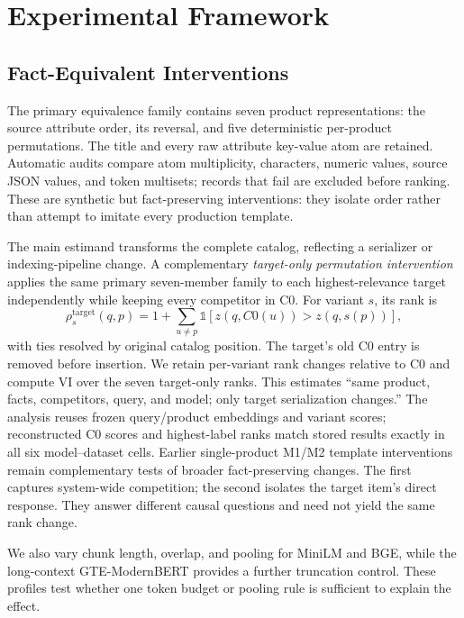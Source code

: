 \section{Experimental Framework}

\subsection{Fact-Equivalent Interventions}

The primary equivalence family contains seven product representations: the source attribute order, its reversal, and five deterministic per-product permutations. The title and every raw attribute key-value atom are retained. Automatic audits compare atom multiplicity, characters, numeric values, source JSON values, and token multisets; records that fail are excluded before ranking. These are synthetic but fact-preserving interventions: they isolate order rather than attempt to imitate every production template.

The main estimand transforms the complete catalog, reflecting a serializer or indexing-pipeline change. A complementary \emph{target-only permutation intervention} applies the same primary seven-member family to each highest-relevance target independently while keeping every competitor in C0. For variant $s$, its rank is
\begin{equation}
\rho^{\mathrm{target}}_s(q,p)=1+\sum_{u\ne p}\mathbb{1}[z(q,C0(u))>z(q,s(p))],
\end{equation}
with ties resolved by original catalog position. The target's old C0 entry is removed before insertion. We retain per-variant rank changes relative to C0 and compute VI over the seven target-only ranks. This estimates ``same product, facts, competitors, query, and model; only target serialization changes.'' The analysis reuses frozen query/product embeddings and variant scores; reconstructed C0 scores and highest-label ranks match stored results exactly in all six model--dataset cells. Earlier single-product M1/M2 template interventions remain complementary tests of broader fact-preserving changes. The first captures system-wide competition; the second isolates the target item's direct response. They answer different causal questions and need not yield the same rank change.

We also vary chunk length, overlap, and pooling for MiniLM and BGE, while the long-context GTE-ModernBERT provides a further truncation control. These profiles test whether one token budget or pooling rule is sufficient to explain the effect.


